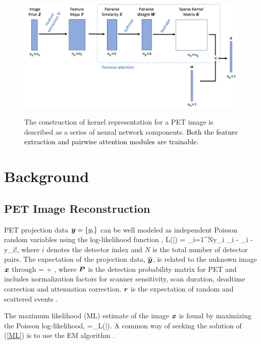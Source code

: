 \documentclass[]{IEEETran}
\newcommand{\txtb}[1]{\textcolor{black}{#1}}
\begin{document}
	\begin{figure}[t]
		\vspace{-0pt}
		\footnotesize
		\centering
		{\includegraphics[trim=0.5cm 0cm 0cm 0cm, clip,width=5in]{deep_kernel.png}}
		\caption{The construction of kernel representation for a PET image is described as a series of neural network components.  \txtb{Both the feature extraction and pairwise attention modules are trainable.}}
		\label{fig:1}
		\vspace{-0pt}
	\end{figure}
	
	
	
	\section{Background}
	\subsection{PET Image Reconstruction}
	PET projection data $\bm{y} = \left\{y_{i}\right\}$ can be well modeled as independent Poisson random variables using the log-likelihood function \cite{Qi2006},
	\beq
	L(\y|\x) = \sum_{i=1}^{N}y_{i} \log {}_{i} - _{i} - \log y_{i}!,
	\eeq
	where $i$ denotes the detector index and $N$ is the total number of detector pairs. The expectation of the projection data, $\overline{\bm{y}} $, is related to the unknown image $\bm{x}$ through
	\beq
	\overline{\y} = \Pm \x + \rv,
	\label{PET model}
	\eeq
	where $\bm{P} $ is the detection probability matrix for PET and includes normalization factors for scanner sensitivity, scan duration, deadtime correction and attenuation correction. $\bm{r}$ is the expectation of random and scattered events \cite{Qi2006}.
	
	The maximum likelihood (ML) estimate of the image $\bm{x}$ is found by maximizing the Poisson log-likelihood,
	\beq
	\hat{\x} =\arg\max\limits_{\x {}}L(\y|\x).
	\label{ML}
	\eeq
	A common way of seeking the solution of (\ref{ML}) is to use the EM algorithm \cite{Shepp1982}.
	
\end{document}
